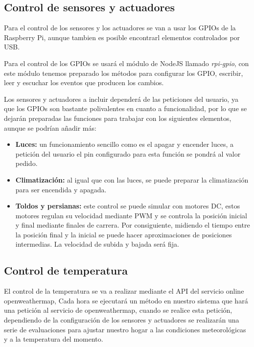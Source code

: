 \documentclass[10pt,journal,compsoc]{IEEEtran}
\begin{document}
\subsection{Control de sensores y actuadores}
Para el control de los sensores y los actuadores se van a usar los GPIOs de la 
Raspberry Pi, aunque tambien es posible encontrarl elementos controlados por USB.

Para el control de los GPIOs se usará el módulo de NodeJS llamado 
\textit{rpi-gpio}, con este módulo tenemos preparado los métodos para configurar 
los GPIO, escribir, leer y escuchar los eventos que producen los cambios.

Los sensores y actuadores a incluir dependerá de las peticiones del usuario, ya 
que los GPIOs son bastante polivalentes en cuanto a funcionalidad, por lo que se 
dejarán preparadas las funciones para trabajar con los siguientes elementos, 
aunque se podrían añadir más:

\begin{itemize}
  \item \textbf{Luces:} un funcionamiento sencillo como es el apagar y encender luces, a 
  petición del usuario el pin configurado para esta función se pondrá al valor 
  pedido.
  \item \textbf{Climatización:} al igual que con las luces, se puede preparar la 
  climatización para ser encendida y apagada.
  \item \textbf{Toldos y persianas:} este control se puede simular con motores DC, estos 
  motores regulan su velocidad mediante PWM y se controla la posición inicial y 
  final mediante finales de carrera. 
  Por consiguiente, midiendo el tiempo entre la 
  posición final y la inicial se puede hacer aproximaciones de posiciones 
  intermedias. La velocidad de subida y bajada será fija.
\end{itemize}

\subsection{Control de temperatura}
El control de la temperatura se va a realizar mediante el API del servicio online openweathermap, 
Cada hora se ejecutará un método en nuestro sistema que hará una petición al 
servicio de openweathermap, cuando se realice esta petición, dependiendo de la 
configuración de los sensores y actuadores se realizarán una serie de 
evaluaciones para ajustar nuestro hogar a las condiciones meteorológicas y a la 
temperatura del momento.
\end{document}
